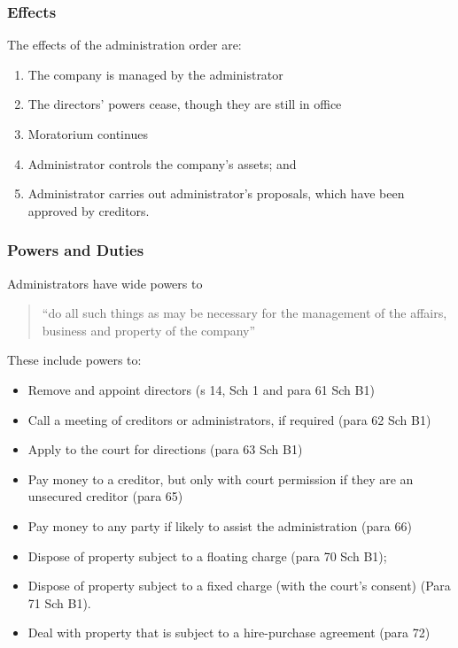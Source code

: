 \documentclass[
]{article}
\providecommand{\tightlist}{%
  \setlength{\itemsep}{0pt}\setlength{\parskip}{0pt}}
\begin{document}
\hypertarget{effects}{%
\subsubsection{Effects}\label{effects}}

The effects of the administration order are:

\begin{enumerate}
\tightlist
\item
  The company is managed by the administrator
\item
  The directors' powers cease, though they are still in office
\item
  Moratorium continues
\item
  Administrator controls the company's assets; and
\item
  Administrator carries out administrator's proposals, which have been
  approved by creditors.
\end{enumerate}

\hypertarget{powers-and-duties}{%
\subsubsection{Powers and Duties}\label{powers-and-duties}}

Administrators have wide powers to

\begin{quote}
``do all such things as may be necessary for the management of the
affairs, business and property of the company''
\end{quote}

These include powers to:

\begin{itemize}
\tightlist
\item
  Remove and appoint directors (s 14, Sch 1 and para 61 Sch B1)
\item
  Call a meeting of creditors or administrators, if required (para 62
  Sch B1)
\item
  Apply to the court for directions (para 63 Sch B1)
\item
  Pay money to a creditor, but only with court permission if they are an
  unsecured creditor (para 65)
\item
  Pay money to any party if likely to assist the administration (para
  66)
\item
  Dispose of property subject to a floating charge (para 70 Sch B1);
\item
  Dispose of property subject to a fixed charge (with the court's
  consent) (Para 71 Sch B1).
\item
  Deal with property that is subject to a hire-purchase agreement (para
  72)
\end{itemize}
\end{document}
